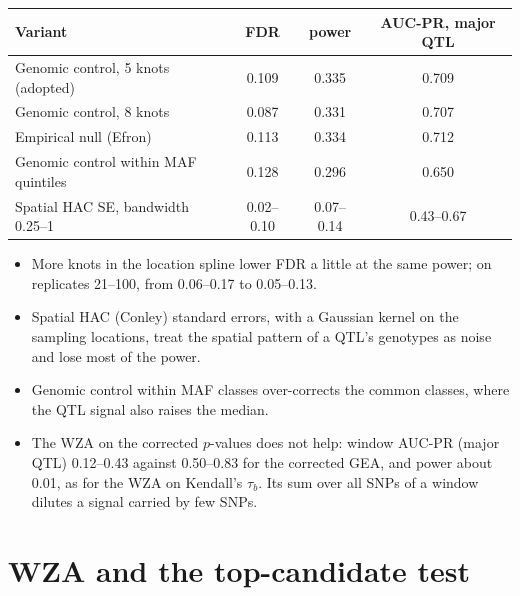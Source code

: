 \begin{center}
\begin{tabular}{lccc}
\toprule
Variant & FDR & power & AUC-PR, major QTL \\
\midrule
Genomic control, 5 knots (adopted) & 0.109 & 0.335 & 0.709 \\
Genomic control, 8 knots & 0.087 & 0.331 & 0.707 \\
Empirical null (Efron) & 0.113 & 0.334 & 0.712 \\
Genomic control within MAF quintiles & 0.128 & 0.296 & 0.650 \\
Spatial HAC SE, bandwidth 0.25--1 & 0.02--0.10 & 0.07--0.14 & 0.43--0.67 \\
\bottomrule
\end{tabular}
\end{center}

\begin{itemize}
\item More knots in the location spline lower FDR a little at the same
  power; on replicates 21--100, from 0.06--0.17 to 0.05--0.13.
\item Spatial HAC (Conley) standard errors, with a Gaussian kernel on the
  sampling locations, treat the spatial pattern of a QTL's genotypes as
  noise and lose most of the power.
\item Genomic control within MAF classes over-corrects the common classes,
  where the QTL signal also raises the median.
\item The WZA on the corrected $p$-values does not help: window AUC-PR
  (major QTL) 0.12--0.43 against 0.50--0.83 for the corrected GEA, and
  power about 0.01, as for the WZA on Kendall's $\tau_b$. Its sum over all
  SNPs of a window dilutes a signal carried by few SNPs.
\end{itemize}



\section{WZA and the top-candidate test}
\label{sec:wza}

